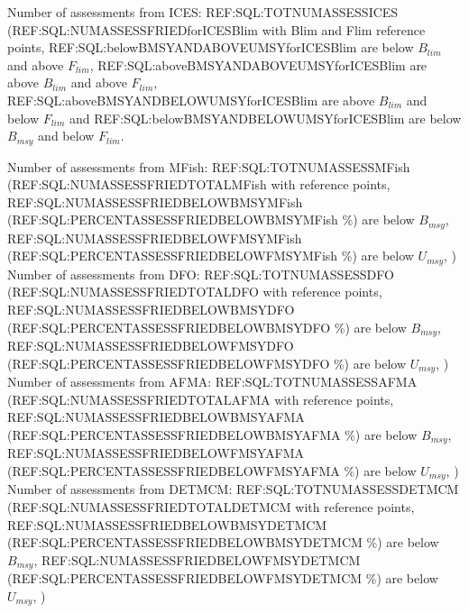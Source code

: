 Number of assessments from ICES: REF:SQL:TOTNUMASSESSICES (REF:SQL:NUMASSESSFRIEDforICESBlim with Blim and Flim reference points, REF:SQL:belowBMSYANDABOVEUMSYforICESBlim are below $B_{lim}$ and above $F_{lim}$, REF:SQL:aboveBMSYANDABOVEUMSYforICESBlim are above $B_{lim}$ and above $F_{lim}$, REF:SQL:aboveBMSYANDBELOWUMSYforICESBlim are above $B_{lim}$ and below $F_{lim}$ and REF:SQL:belowBMSYANDBELOWUMSYforICESBlim are below $B_{msy}$ and below $F_{lim}$.

Number of assessments from MFish: REF:SQL:TOTNUMASSESSMFish (REF:SQL:NUMASSESSFRIEDTOTALMFish with reference points, REF:SQL:NUMASSESSFRIEDBELOWBMSYMFish (REF:SQL:PERCENTASSESSFRIEDBELOWBMSYMFish \%) are below $B_{msy}$, REF:SQL:NUMASSESSFRIEDBELOWFMSYMFish (REF:SQL:PERCENTASSESSFRIEDBELOWFMSYMFish \%) are below $U_{msy}$, ) \\
Number of assessments from DFO: REF:SQL:TOTNUMASSESSDFO (REF:SQL:NUMASSESSFRIEDTOTALDFO with reference points, REF:SQL:NUMASSESSFRIEDBELOWBMSYDFO (REF:SQL:PERCENTASSESSFRIEDBELOWBMSYDFO \%) are below $B_{msy}$, REF:SQL:NUMASSESSFRIEDBELOWFMSYDFO (REF:SQL:PERCENTASSESSFRIEDBELOWFMSYDFO \%) are below $U_{msy}$, ) \\
Number of assessments from AFMA: REF:SQL:TOTNUMASSESSAFMA (REF:SQL:NUMASSESSFRIEDTOTALAFMA with reference points, REF:SQL:NUMASSESSFRIEDBELOWBMSYAFMA (REF:SQL:PERCENTASSESSFRIEDBELOWBMSYAFMA \%) are below $B_{msy}$, REF:SQL:NUMASSESSFRIEDBELOWFMSYAFMA (REF:SQL:PERCENTASSESSFRIEDBELOWFMSYAFMA \%) are below $U_{msy}$, ) \\
Number of assessments from DETMCM: REF:SQL:TOTNUMASSESSDETMCM (REF:SQL:NUMASSESSFRIEDTOTALDETMCM with reference points, REF:SQL:NUMASSESSFRIEDBELOWBMSYDETMCM (REF:SQL:PERCENTASSESSFRIEDBELOWBMSYDETMCM \%) are below $B_{msy}$, REF:SQL:NUMASSESSFRIEDBELOWFMSYDETMCM (REF:SQL:PERCENTASSESSFRIEDBELOWFMSYDETMCM \%) are below $U_{msy}$, ) \\

